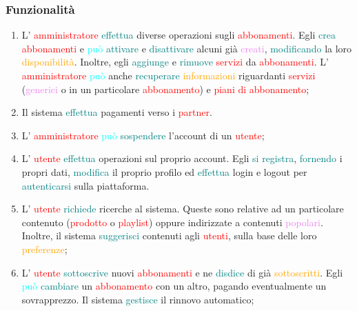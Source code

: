 \subsubsection{Funzionalità}
\begin{enumerate}
    \item L' \textcolor{red}{amministratore} \textcolor{teal}{effettua} diverse operazioni sugli \textcolor{red}{abbonamenti}.
    Egli \textcolor{teal}{crea} \textcolor{red}{abbonamenti} e \textcolor{cyan}{può} \textcolor{teal}{attivare} e
    \textcolor{teal}{disattivare} alcuni già \textcolor{violet}{creati}, \textcolor{teal}{modificando} la loro \textcolor{orange}{disponibilità}.
    Inoltre, egli \textcolor{teal}{aggiunge} e \textcolor{teal}{rimuove} \textcolor{red}{servizi} da \textcolor{red}{abbonamenti}.
    L' \textcolor{red}{amministratore} \textcolor{cyan}{può} anche \textcolor{teal}{recuperare} \textcolor{orange}{informazioni} riguardanti
    \textcolor{red}{servizi} (\textcolor{violet}{generici} o in un particolare \textcolor{red}{abbonamento}) e \textcolor{red}{piani di abbonamento};
    \item Il sistema \textcolor{teal}{effettua} pagamenti verso i \textcolor{red}{partner}.
    \item L' \textcolor{red}{amministratore} \textcolor{cyan}{può} \textcolor{teal}{sospendere} l'account di un \textcolor{red}{utente};
    \item L' \textcolor{red}{utente} \textcolor{teal}{effettua} operazioni sul proprio account. Egli \textcolor{teal}{si registra},
    \textcolor{teal}{fornendo} i propri dati, \textcolor{teal}{modifica} il proprio profilo ed \textcolor{teal}{effettua}
    login e logout per \textcolor{teal}{autenticarsi} sulla piattaforma.
    \item L' \textcolor{red}{utente} \textcolor{teal}{richiede} ricerche al sistema. Queste sono relative
    ad un particolare contenuto (\textcolor{red}{prodotto} o \textcolor{red}{playlist}) oppure indirizzate a contenuti
    \textcolor{violet}{popolari}. Inoltre, il sistema \textcolor{teal}{suggerisci} contenuti agli
    \textcolor{red}{utenti}, sulla base delle loro \textcolor{orange}{preferenze};
    \item L' \textcolor{red}{utente} \textcolor{teal}{sottoscrive} nuovi \textcolor{red}{abbonamenti} e ne \textcolor{teal}{disdice} di già
    \textcolor{orange}{sottoscritti}. Egli \textcolor{cyan}{può} \textcolor{teal}{cambiare} un \textcolor{red}{abbonamento} con un altro,
    pagando eventualmente un sovrapprezzo. Il sistema \textcolor{teal}{gestisce} il rinnovo automatico;

\end{enumerate}
